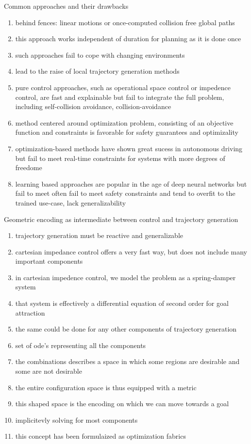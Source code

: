 Common approaches and their drawbacks
\begin{enumerate}
  \item behind fences: linear motions or once-computed collision free global paths
  \item this approach works independent of duration for planning as it is done
  once
  \item such approaches fail to cope with changing environments
  \item lead to the raise of local trajectory generation methods
  \item pure control approaches, such as operational space control or impedence
  control, are fast and explainable but fail to integrate the full problem,
  including self-collision avoidance, collision-avoidance
  \item method centered around optimization problem, consisting of an objective
  function and constraints is favorable for safety guarantees and optimizality
  \item optimization-based methods have shown great sucess in autonomous driving
  but fail to meet real-time constraints for systems with more degrees of
  freedome
  \item learning based approaches are popular in the age of deep neural networks
  but fail to meet often fail to meet safety constraints and tend to overfit
  to the trained use-case, lack generalizability
\end{enumerate}
Geometric encoding as intermediate between control and trajectory generation
\begin{enumerate}
  \item trajectory generation must be reactive and generalizable
  \item cartesian impedance control offers a very fast way, but does not include
  many important components
  \item in cartesian impedence control, we model the problem as a spring-damper
  system
  \item that system is effectively a differential equation of second order for
  goal attraction
  \item the same could be done for any other components of trajectory generation
  \item set of ode's representing all the components
  \item the combinations describes a space in which some regions are desirable
  and some are not desirable
  \item the entire configuration space is thus equipped with a metric
  \item this shaped space is the encoding on which we can move towards a goal
  \item implicitevly solving for most components
  \item this concept has been formulaized as optimization fabrics
\end{enumerate}
